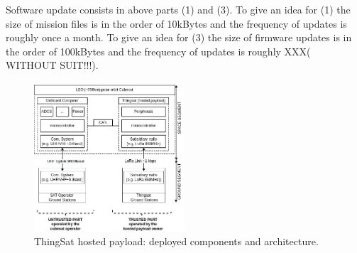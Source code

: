
Software update consists in above parts (1) and (3). To give an idea
for (1) the size of mission files is in the order of 10kBytes and the frequency of updates is roughly once a month. 
To give an idea 
for (3) the size of firmware updates is in the order of 100kBytes and the frequency of updates is roughly XXX( WITHOUT SUIT!!!).

\begin{figure}[t]
    \includegraphics[width=0.5\textwidth]{Figures/globecom-thingsat-mods.jpg}
    \caption{ThingSat hosted payload: deployed components and architecture.}
    \label{fig:thingsat-archi}
\end{figure}